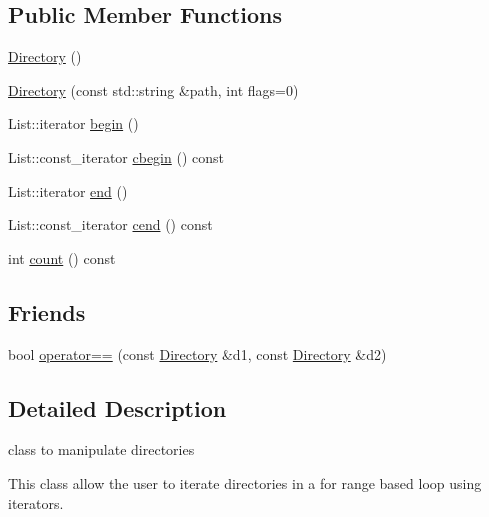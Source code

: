 \subsection*{Public Member Functions}
\begin{DoxyCompactItemize}
\item 
\hyperlink{a00025_a15a43d83cf77e59c42b39bd9555e299d}{Directory} ()
\item 
\hyperlink{a00025_ab3189b0a174f4d1e882950a59a9fcb60}{Directory} (const std\-::string \&path, int flags=0)
\item 
List\-::iterator \hyperlink{a00025_a2f1849630c9510c2def1e6319699e632}{begin} ()
\item 
List\-::const\-\_\-iterator \hyperlink{a00025_a4f4cd4efd1b45f84b3f496adc78bdd59}{cbegin} () const 
\item 
List\-::iterator \hyperlink{a00025_ae7b221f6f85fcbc86c25551424305169}{end} ()
\item 
List\-::const\-\_\-iterator \hyperlink{a00025_a483c938787d008beb07ae8ccf266b354}{cend} () const 
\item 
int \hyperlink{a00025_ae67b30222681e45d5746c89ad34c0fcb}{count} () const 
\end{DoxyCompactItemize}
\subsection*{Friends}
\begin{DoxyCompactItemize}
\item 
bool \hyperlink{a00025_ae7d58aba89bf9b699fa808b3242dc281}{operator==} (const \hyperlink{a00025}{Directory} \&d1, const \hyperlink{a00025}{Directory} \&d2)
\end{DoxyCompactItemize}


\subsection{Detailed Description}
class to manipulate directories 

This class allow the user to iterate directories in a for range based loop using iterators. 


